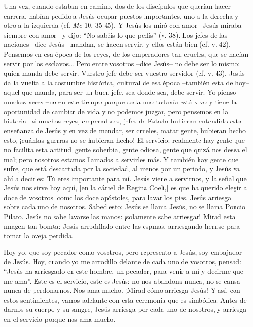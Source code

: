 			\begin{body}Una vez, cuando estaban en camino, dos de los discípulos que querían hacer carrera, habían pedido a Jesús ocupar puestos importantes, uno a la derecha y otro a la izquierda (cf. \textit{Mc} 10, 35-45). Y Jesús los miró con amor –Jesús miraba siempre con amor– y dijo: “No sabéis lo que pedís” (v. 38). Los jefes de las naciones –dice Jesús– mandan, se hacen servir, y ellos están bien (cf. v. 42). Pensemos en esa época de los reyes, de los emperadores tan crueles, que se hacían servir por los esclavos... Pero entre vosotros –dice Jesús– no debe ser lo mismo: quien manda debe servir. Vuestro jefe debe ser vuestro servidor (cf. v. 43). Jesús da la vuelta a la costumbre histórica, cultural de esa época –también esta de hoy– aquel que manda, para ser un buen jefe, sea donde sea, debe servir. Yo pienso muchas veces –no en este tiempo porque cada uno todavía está vivo y tiene la oportunidad de cambiar de vida y no podemos juzgar, pero pensemos en la historia– si muchos reyes, emperadores, jefes de Estado hubieran entendido esta enseñanza de Jesús y en vez de mandar, ser crueles, matar gente, hubieran hecho esto, ¡cuántas guerras no se hubieran hecho! El servicio: realmente hay gente que no facilita esta actitud, gente soberbia, gente odiosa, gente que quizá nos desea el mal; pero nosotros estamos llamados a servirles más. Y también hay gente que sufre, que está descartada por la sociedad, al menos por un periodo, y Jesús va ahí a decirles: Tú eres importante para mí. Jesús viene a servirnos, y la señal que Jesús nos sirve hoy aquí, [en la cárcel de Regina Coeli,] es que ha querido elegir a doce de vosotros, como los doce apóstoles, para lavar los pies. Jesús arriesga sobre cada uno de nosotros. Sabed esto: Jesús se llama Jesús, no se llama Poncio Pilato. Jesús no sabe lavarse las manos: ¡solamente sabe arriesgar! Mirad esta imagen tan bonita: Jesús arrodillado entre las espinas, arriesgando herirse para tomar la oveja perdida. \end{body}
			
			\begin{body}Hoy yo, que soy pecador como vosotros, pero represento a Jesús, soy embajador de Jesús. Hoy, cuando yo me arrodillo delante de cada uno de vosotros, pensad: “Jesús ha arriesgado en este hombre, un pecador, para venir a mí y decirme que me ama”. Este es el servicio, este es Jesús: no nos abandona nunca, no se cansa nunca de perdonarnos. Nos ama mucho. ¡Mirad cómo arriesga Jesús! Y así, con estos sentimientos, vamos adelante con esta ceremonia que es simbólica. Antes de darnos su cuerpo y su sangre, Jesús arriesga por cada uno de nosotros, y arriesga en el servicio porque nos ama mucho. \end{body}
			
